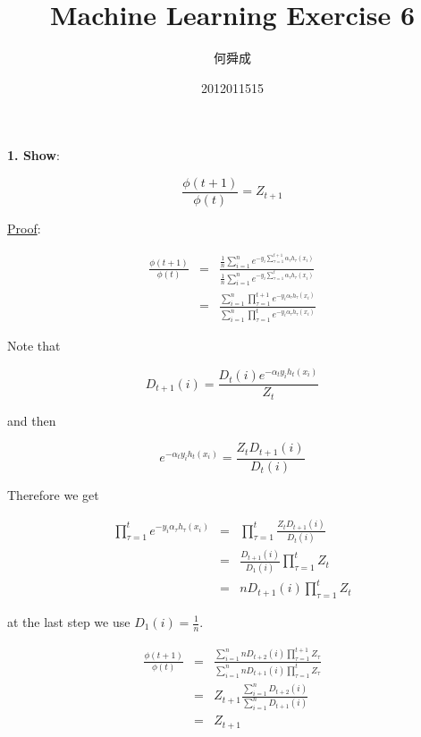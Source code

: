 \documentclass[UTF8]{ctexart}
\author{何舜成}
\date{2012011515}
\title{Machine Learning Exercise 6}
\begin{document}
\maketitle
\textbf{1. Show}:\par
\begin{equation*}
\frac{\phi(t+1)}{\phi(t)}=Z_{t+1}
\end{equation*}\par
\uline{Proof}:\par
\begin{eqnarray*}
\frac{\phi(t+1)}{\phi(t)}&=&\frac{\frac{1}{n}\sum_{i=1}^{n}e^{-y_{i}\sum_{\tau=1}^{t+1}\alpha_{\tau}h_{\tau}(x_{i})}}{\frac{1}{n}\sum_{i=1}^{n}e^{-y_{i}\sum_{\tau=1}^{t}\alpha_{\tau}h_{\tau}(x_{i})}}\\
&=&\frac{\sum_{i=1}^{n}\prod_{\tau=1}^{t+1}e^{-y_{i}\alpha_{\tau}h_{\tau}(x_{i})}}{\sum_{i=1}^{n}\prod_{\tau=1}^{t}e^{-y_{i}\alpha_{\tau}h_{\tau}(x_{i})}}
\end{eqnarray*}\par
Note that\par
\begin{equation*}
D_{t+1}(i)=\frac{D_{t}(i)e^{-\alpha_{t}y_{i}h_{t}(x_{i})}}{Z_{t}}
\end{equation*}\par
and then\par
\begin{equation*}
e^{-\alpha_{t}y_{i}h_{t}(x_{i})}=\frac{Z_{t}D_{t+1}(i)}{D_{t}(i)}
\end{equation*}\par
Therefore we get\par
\begin{eqnarray*}
\prod_{\tau=1}^{t}e^{-y_{i}\alpha_{\tau}h_{\tau}(x_{i})}&=&\prod_{\tau=1}^{t}\frac{Z_{t}D_{t+1}(i)}{D_{t}(i)}\\
&=&\frac{D_{t+1}(i)}{D_{1}(i)}\prod_{\tau=1}^{t}Z_{t}\\
&=&nD_{t+1}(i)\prod_{\tau=1}^{t}Z_{t}
\end{eqnarray*}\par
at the last step we use $D_{1}(i)=\frac{1}{n}$.\par
\begin{eqnarray*}
\frac{\phi(t+1)}{\phi(t)}&=&\frac{\sum_{i=1}^{n}nD_{t+2}(i)\prod_{\tau=1}^{t+1}Z_{\tau}}{\sum_{i=1}^{n}nD_{t+1}(i)\prod_{\tau=1}^{t}Z_{\tau}}\\
&=&Z_{t+1}\frac{\sum_{i=1}^{n}D_{t+2}(i)}{\sum_{i=1}^{n}D_{t+1}(i)}\\
&=&Z_{t+1}
\end{eqnarray*}\par
\end{document}
